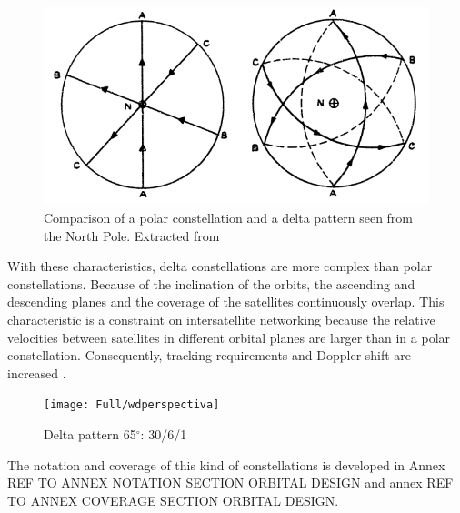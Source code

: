 \begin{figure}[h!]
\centerline{\includegraphics[scale=0.4]{Full/polarvswalker.png}}
\caption{Comparison of a polar constellation and a delta pattern seen from the North Pole. Extracted from \cite{Walker1977}}
\label{fig:delta pattern North Pole}
\end{figure}

With these characteristics, delta constellations are more complex than polar constellations. Because of the inclination of the orbits, the ascending and descending planes and the coverage of the satellites continuously overlap. This characteristic is a constraint on intersatellite networking because the relative velocities between satellites in different orbital planes are larger than in a polar constellation. Consequently, tracking requirements and Doppler shift are increased \cite{Wood2001}.

\begin{figure}[h!]
\centerline{\texttt{[image: Full/wdperspectiva]}}
\caption{Delta pattern 65$^{\circ}$: 30/6/1}
\label{fig:delta pattern notation}
\end{figure}

The notation and coverage of this kind of constellations is developed in Annex REF TO ANNEX NOTATION SECTION ORBITAL DESIGN and annex REF TO ANNEX COVERAGE SECTION ORBITAL DESIGN.